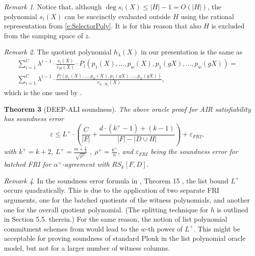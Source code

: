 \documentclass[11pt,article,oneside]{memoir}
\newtheorem{thm}{Theorem}[]
\theoremstyle{definition}
\theoremstyle{remark}
\newtheorem{rem}[thm]{Remark}
\begin{document}
\begin{rem}
Notice that, although $\deg s_i(X) \leq |H| -  1 = O(|H|)$, the polynomial $s_i(X)$ can be succinctly evaluated outside $H$ using the rational representation from \eqref{e:SelectorPoly}. 
It is for this reason that also $H$ is excluded from the samping space of $z$.
\end{rem}

\begin{rem}
The quotient polynomial $h_\lambda(X)$ in our presentation is the same as
\begin{multline*}
\sum_{i=1}^{C} \lambda^{i-1} \cdot\frac{ s_i(X)}{v_H(X)}\cdot P_i(p_1(X),\ldots ,p_w(X),p_1(gX), \ldots, p_w(gX)) =
\\
\sum_{i=1}^{C} \lambda^{i-1} \cdot \frac{P_i(p_1(X),\ldots ,p_w(X),p_1(gX), \ldots, p_w(gX))}{v_{a_i\cdot H_i}(X)},
\end{multline*}
which is the one used by \cite{DEEPFRI}.
\end{rem}

\begin{thm}[DEEP-ALI soundness]
\label{thm:DEEPsoundness} 
The above oracle proof for AIR satisfiability has soundness error 
\begin{equation}
\label{e:SoundnessDEEPALI}
\varepsilon \leq L^+ \cdot \left(\frac{C}{|F|} + \frac{d\cdot (k^+ - 1) + (k - 1)}{|F| - |D\cup H|}\right) + \varepsilon_{FRI},
\end{equation}
with  $k^+ = k+2$,  $L^+ = \frac{m+\frac{1}{2}}{\sqrt{\rho^+}}$ , $\rho^+=\frac{k^+}{n}$, and $\varepsilon_{FRI}$ being the soundness error for batched FRI for $\alpha^+$-agreement with $RS_k[F,D]$. 
\end{thm}

\begin{rem}
 In the soundness error formula in  \cite{DEEPFRI}, Theorem 15 , the list bound $L^+$ occurs quadratically. 
This is due to the application of two separate FRI arguments, one for the batched quotients of the witness polynomials, and another one for the overall quotient polynomial.  
(The splitting technique for $h$ is outlined in Section 5.5. therein.)
For the same reason, the notion of list polynomial commitment schemes from \cite{Redshift} would lead to the  $w$-th power of $L^+$. 
This might be acceptable for proving soundness of standard Plonk in the list polynomial oracle model, but not for a larger number of witness columns. 
\end{rem}
\end{document}
